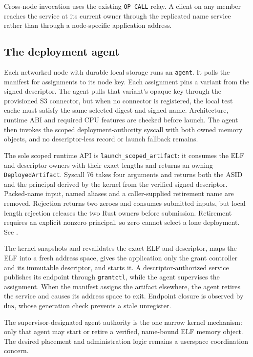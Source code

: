 Cross-node invocation uses the existing \texttt{OP\_CALL} relay. A client on
any member reaches the service at its current owner through the replicated
name service rather than through a node-specific application address.

\subsection{The deployment agent}

Each networked node with durable local storage runs an \texttt{agent}. It polls
the manifest for assignments to its node key. Each assignment pins a variant
from the signed descriptor. The agent pulls that variant's opaque key through
the provisioned S3 connector, but when no connector is registered, the local test
cache must satisfy the same selected digest and signed name. Architecture,
runtime ABI and required CPU features are checked before launch. The agent
then invokes the scoped deployment-authority syscall with both owned memory
objects, and no descriptor-less record or launch fallback remains.

The sole scoped runtime API is \texttt{launch\_scoped\_artifact}: it consumes
the ELF and descriptor owners with their exact lengths and returns an owning
\texttt{DeployedArtifact}. Syscall 76 takes four arguments and returns both
the ASID and the principal derived by the kernel from the verified signed
descriptor. Packed-name input, named aliases and a caller-supplied retirement
name are removed. Rejection returns two zeroes and consumes submitted inputs, but
local length rejection releases the two Rust owners before submission.
Retirement requires an explicit nonzero principal, so zero cannot select a lone
deployment. See .

The kernel snapshots and revalidates the exact ELF and descriptor, maps the
ELF into a fresh address space, gives the application only the grant controller
and its immutable descriptor, and starts it. A descriptor-authorized service
publishes its endpoint through \texttt{grantctl}, while the agent supervises the
assignment. When the manifest assigns the artifact elsewhere, the agent
retires the service and causes its address space to exit. Endpoint closure is
observed by \texttt{dns}, whose generation check prevents a stale unregister.

The supervisor-designated agent authority is the one narrow kernel mechanism:
only that agent may start or retire a verified, name-bound ELF memory
object. The desired placement and administration logic remains a userspace
coordination concern.

